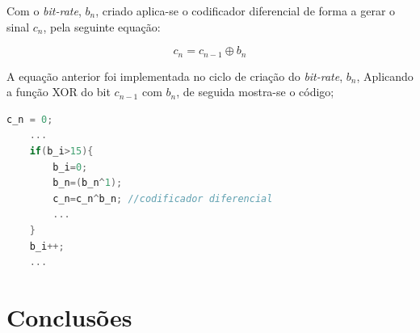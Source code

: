 \documentclass[11pt]{article}
\numberwithin{equation}{section}
\begin{document}
Com o \textit{bit-rate}, $b_n$, criado aplica-se o codificador diferencial de forma a gerar o sinal $c_n$, pela seguinte equação:

\vspace{-3mm}
\begin{equation}
		c_n = c_{n-1} \oplus b_n
\end{equation} 

A equação anterior foi implementada no ciclo de criação do \textit{bit-rate}, $b_n$,  Aplicando a função XOR do bit $c_{n-1}$ com $b_n$, de seguida mostra-se o código;
\begin{lstlisting}[language=C]
	c_n = 0;
	...
	if(b_i>15){
		b_i=0;
		b_n=(b_n^1);
		c_n=c_n^b_n; //codificador diferencial
		...
	}
	b_i++;
	...
\end{lstlisting}



		
\subsection{} %



\subsection{} %


\section{Conclusões}
\end{document}
